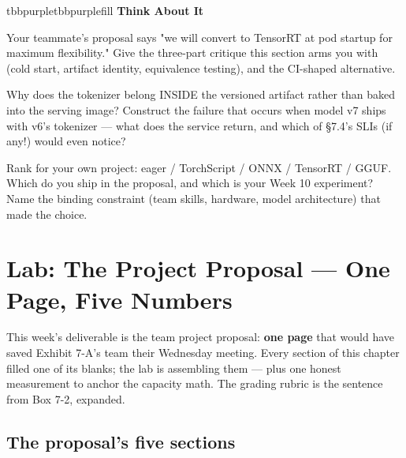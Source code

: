 \begin{calloutbox}{tbbpurple}{tbbpurplefill}
{\normalsize\bfseries\color{tbbpurple}Think About It}\par\vspace{3pt}
\begin{tbbitemize}
  \item Your teammate's proposal says "we will convert to TensorRT at pod startup for maximum flexibility." Give the three-part critique this section arms you with (cold start, artifact identity, equivalence testing), and the CI-shaped alternative.
  \item Why does the tokenizer belong INSIDE the versioned artifact rather than baked into the serving image? Construct the failure that occurs when model v7 ships with v6's tokenizer — what does the service return, and which of §7.4's SLIs (if any!) would even notice?
  \item Rank for your own project: eager / TorchScript / ONNX / TensorRT / GGUF. Which do you ship in the proposal, and which is your Week 10 experiment? Name the binding constraint (team skills, hardware, model architecture) that made the choice.
\end{tbbitemize}
\end{calloutbox}

\section{Lab: The Project Proposal — One Page, Five Numbers}

This week's deliverable is the team project proposal: \textbf{one page} that would have saved Exhibit 7-A's team their Wednesday meeting. Every section of this chapter filled one of its blanks; the lab is assembling them — plus one honest measurement to anchor the capacity math. The grading rubric is the sentence from Box 7-2, expanded.

\subsection*{The proposal's five sections}

